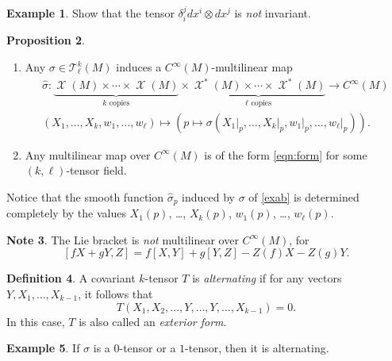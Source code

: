 \documentclass[10pt,letterpaper,cm]{nupset}
\theoremstyle{definition}
\newtheorem{definition}{Definition}[subsection]
\newtheorem{exmp}[definition]{Example}
\newtheorem{note}[definition]{Note}
\theoremstyle{theorem}
\newtheorem{prop}[definition]{Proposition}
\theoremstyle{remark}
\newcommand{\T}{\mathcal T}
\newcommand{\1}{\mathbf{1}}
\newcommand{\0}{\vec 0}
\DeclareMathOperator{\vf}{\mathscr{X}}
\begin{document}
\begin{exmp}
Show that the tensor $\delta_i^j dx^i \otimes dx^j$ is \emph{not} invariant. 
\end{exmp}

\pagebreak

\begin{prop} $ $
\begin{enumerate}
\item Any $ \sigma \in \T_{\ell}^k(M)$ induces a $C^{\infty}(M)$-multilinear map 
\begin{gather*}
\hat{\sigma} : \underbrace{\vf(M) \times \cdots \times \vf(M)}_{k \text{ copies}} \times \underbrace{\vf^{\ast}(M) \times \cdots \times \vf^{\ast}(M)}_{\ell \text{ copies}}\longrightarrow C^{\infty}(M)
\label{eqn:form} \\ \left(X_1, \ldots, X_k, w_1, \ldots, w_{\ell}\right)\mapsto \left(p \mapsto \sigma \left(X_1\bigr\rvert_p, \ldots, X_k\bigr\rvert_p, w_1\bigr\rvert_p, \ldots, w_{\ell}\bigr\rvert_p\right)\right). \tag{$\ast$}
\end{gather*}
\item Any multilinear map over $C^{\infty}(M)$ is of the form \eqref{eqn:form} for some $\left(k, \ell\right)$-tensor field.
\end{enumerate}
\end{prop}

Notice that the smooth function $\hat{\sigma}_p$ induced by $\sigma$ of \cref{exab} is determined completely by  the values $X_1(p)$, \ldots, $X_k(p)$, $w_1(p)$, \ldots, $w_{\ell}(p)$.

\medskip

\begin{note}
The Lie bracket is \emph{not} multilinear over $C^{\infty}(M)$, for $$\left[fX + gY, Z\right] = f\left[X, Y\right] + g[Y, Z]-Z(f)X -Z(g)Y.$$
\end{note}

\medskip


\begin{definition}
A covariant $k$-tensor $T$ is \textit{alternating}  if for any vectors $Y, X_1, \ldots, X_{k-1}$, it follows that $$T(X_1, X_2, \ldots, Y, \ldots, Y, \ldots, X_{k-1}) =0.$$ In this case, $T$ is also called an \textit{exterior form}.
\end{definition}

\begin{exmp}
If $\sigma$ is a $0$-tensor or a $1$-tensor, then it is alternating.
\end{exmp}
\end{document}
